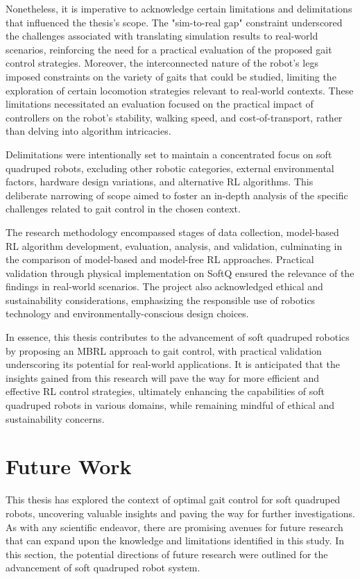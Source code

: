 Nonetheless, it is imperative to acknowledge certain limitations and delimitations that influenced the thesis's scope. The "sim-to-real gap" constraint underscored the challenges associated with translating simulation results to real-world scenarios, reinforcing the need for a practical evaluation of the proposed gait control strategies. Moreover, the interconnected nature of the robot's legs imposed constraints on the variety of gaits that could be studied, limiting the exploration of certain locomotion strategies relevant to real-world contexts. These limitations necessitated an evaluation focused on the practical impact of controllers on the robot's stability, walking speed, and cost-of-transport, rather than delving into algorithm intricacies.

Delimitations were intentionally set to maintain a concentrated focus on soft quadruped robots, excluding other robotic categories, external environmental factors, hardware design variations, and alternative RL algorithms. This deliberate narrowing of scope aimed to foster an in-depth analysis of the specific challenges related to gait control in the chosen context.

The research methodology encompassed stages of data collection, model-based RL algorithm development, evaluation, analysis, and validation, culminating in the comparison of model-based and model-free RL approaches. Practical validation through physical implementation on SoftQ ensured the relevance of the findings in real-world scenarios. The project also acknowledged ethical and sustainability considerations, emphasizing the responsible use of robotics technology and environmentally-conscious design choices.

In essence, this thesis contributes to the advancement of soft quadruped robotics by proposing an MBRL approach to gait control, with practical validation underscoring its potential for real-world applications. It is anticipated that the insights gained from this research will pave the way for more efficient and effective RL control strategies, ultimately enhancing the capabilities of soft quadruped robots in various domains, while remaining mindful of ethical and sustainability concerns.

\section{Future Work}
This thesis has explored the context of optimal gait control for soft quadruped robots, uncovering valuable insights and paving the way for further investigations. As with any scientific endeavor, there are promising avenues for future research that can expand upon the knowledge and limitations identified in this study. In this section, the potential directions of future research were outlined for the advancement of soft quadruped robot system.

